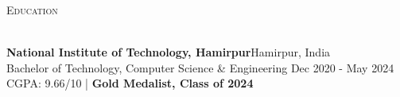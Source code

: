 \documentclass[a4paper]{article}
\newcommand{\tinyBulletSep} { \vspace{2.25mm} }
\newcommand{\bulletSep} { \vspace{1.3mm} }
\newcommand{\sectionSep} { \vspace{3.5mm} }
\newcommand{\lineunder} {
    \vspace*{-8pt} \\
    \hspace*{-15pt} \hrulefill \\
}
\newcommand{\header} [1] {
    {\hspace*{-18pt}\vspace*{6pt} {
        \fontfamily{qcs}\selectfont \large \scshape #1
    }}
    \vspace*{-6pt} \lineunder
    \vspace{1.1mm}
}
\newcommand{\educationItem}[6]{
    \textbf{#1}\hfill #2\\
    #3 \hfill #5\\
    #4\\
    #6
}
\newcommand{\linkFont}[1]{
    \textbf{#1}
}
\newcommand{\link}[2]{
    \href{#1}{\textbf{#2}}
}
\newcommand{\projectItem}[5]{
    {\textbf{#1}} {(\sl #2)}\hfill
    \ifx&#3&%
    \link{#4}{Github}\\
    \else
    \linkFont{\href{#3}{Live Preview}~|~\href{#4}{Github}}\\
    \fi
    \vspace{2pt}
    \begin{itemize}
        #5
    \end{itemize}
}
\begin{document}


\sectionSep


\header{Education}

\educationItem{National Institute of Technology, Hamirpur}{Hamirpur, India}{Bachelor of Technology, Computer Science \& Engineering}{CGPA: 9.66/10 | \textbf{Gold Medalist, Class of 2024}}{Dec 2020 - May 2024}{

}


\sectionSep



\end{document}
